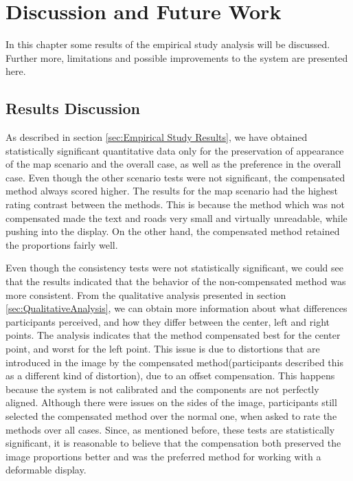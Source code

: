 \documentclass[]{article}
\begin{document}
\clearpage
\section{Discussion and Future Work}

In this chapter some results of the empirical study analysis will be discussed. Further more, limitations and possible improvements to the system are presented here.

\subsection{Results Discussion}

As described in section \ref{sec:Empirical Study Results}, we have obtained statistically significant quantitative data only for the preservation of appearance of the map scenario and the overall case, as well as the preference in the overall case. Even though the other scenario tests were not significant, the compensated method always scored higher. The results for the map scenario had the highest rating contrast between the methods. This is because the method which was not compensated made the text and roads very small and virtually unreadable, while pushing into the display. On the other hand, the compensated method retained the proportions fairly well.

Even though the consistency tests were not statistically significant, we could see that the results indicated that the behavior of the non-compensated method was more consistent. From the qualitative analysis presented in section \ref{sec:QualitativeAnalysis}, we can obtain more information about what differences participants perceived, and how they differ between the center, left and right points. The analysis indicates that the method compensated best for the center point, and worst for the left point. This issue is due to distortions that are introduced in the image by the compensated method(participants described this as a different kind of distortion), due to an offset compensation. This happens because the system is not calibrated and the components are not perfectly aligned. Although there were issues on the sides of the image, participants still selected the compensated method over the normal one, when asked to rate the methods over all cases. Since, as mentioned before, these tests are statistically significant, it is reasonable to believe that the compensation both preserved the image proportions better and was the preferred method for working with a deformable display.
\end{document}
